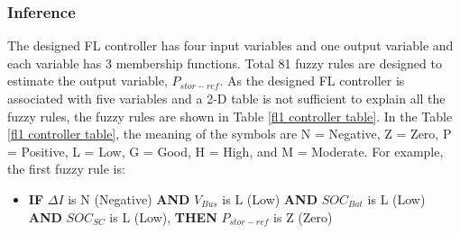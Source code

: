 \subsubsection{Inference} 
The designed FL controller has four input variables and one output variable and each variable has 3 membership functions. Total 81 fuzzy rules are designed to estimate the output variable, $P_{stor-ref}$. As the designed FL controller is associated with five variables and a 2-D table is not sufficient to explain all the fuzzy rules, the fuzzy rules are shown in Table \ref{fl1 controller table}. In the Table \ref{fl1 controller table}, the meaning of the symbols are  N = Negative, Z = Zero, P = Positive, L = Low, G = Good, H = High, and M = Moderate. For example, the first fuzzy rule is: 
\begin{itemize}
\item {\textbf{IF}} $\Delta I$ is N (Negative) {\textbf{AND}} $V_{Bus}$ is L (Low) {\textbf{AND}}  $SOC_{Bat}$ is L (Low) {\textbf{AND}} $SOC_{SC}$ is L (Low), {\textbf{THEN}} $P_{stor-ref}$ is Z (Zero)
\end{itemize}
